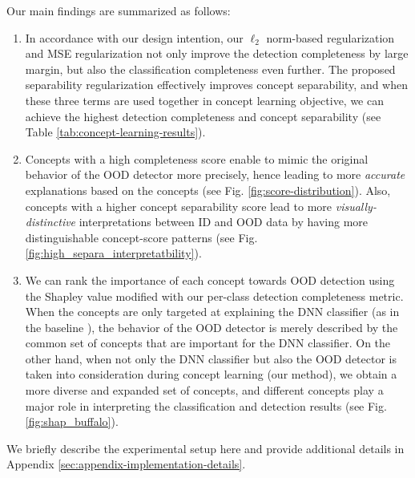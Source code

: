 Our main findings are summarized as follows:
\begin{enumerate}[start=1,label={\bfseries A\arabic*.}]
    \item In accordance with our design intention, our $\ell_2$ norm-based regularization and MSE regularization not only improve the detection completeness by large margin, but also the classification completeness even further. 
    The proposed separability regularization effectively improves concept separability, and when these three terms are used together in concept learning objective, we can achieve the highest detection completeness and concept separability (see Table \ref{tab:concept-learning-results}).
    \item Concepts with a high completeness score enable to mimic the original behavior of the OOD detector more precisely, hence leading to more \textit{accurate} explanations based on the concepts (see Fig. \ref{fig:score-distribution}). 
    Also, concepts with a higher concept separability score lead to more \textit{visually-distinctive} interpretations between ID and OOD data by having more distinguishable concept-score patterns (see Fig. \ref{fig:high_separa_interpretatbility}).
    \item We can rank the importance of each concept towards OOD detection using the Shapley value modified with our per-class detection completeness metric. 
    When the concepts are only targeted at explaining the DNN classifier (as in the baseline \citep{yeh2020completeness}), the behavior of the OOD detector is merely described by the common set of concepts that are important for the DNN classifier.
    On the other hand, when not only the DNN classifier but also the OOD detector is taken into consideration during concept learning (\ie our method), we obtain a more diverse and expanded set of concepts, and different concepts play a major role in interpreting the classification and detection results (see Fig. \ref{fig:shap_buffalo}). 
\end{enumerate}

\fi

We briefly describe the experimental setup here and provide additional details in Appendix \ref{sec:appendix-implementation-details}.

